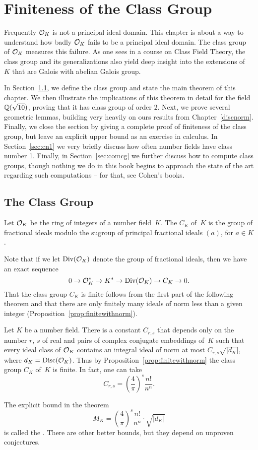 \chapter{Finiteness of the Class Group}\label{ch:classgroup}
Frequently $\mathcal{O}_K$ is not a principal ideal domain.  This chapter is
about a way to understand how badly $\mathcal{O}_K$ fails to be a principal
ideal domain.  The class group of $\mathcal{O}_K$ measures this failure.  As
one sees in a course on Class Field Theory, the class group and its
generalizations also yield deep insight into the 
extensions of~$K$ that are Galois with abelian Galois group.

In Section~\ref{sec:theclassgroup}, we define the class group and
state the main theorem of this chapter.  We then illustrate the
implications of this theorem in detail for the field $\mathbb{Q}(\sqrt{10})$,
proving that it has class group of order $2$. Next, we prove several
geometric lemmas, building very heavily on ours results from
Chapter~\ref{discnorm}.  Finally, we close the section by giving a
complete proof of finiteness of the class group, but leave an explicit
upper bound as an exercise in calculus.  In Section~\ref{sec:cn1} we
very briefly discuss how often number fields have class number 1.
Finally, in Section~\ref{sec:comcg} we further discuss how to compute
class groups, though nothing we do in this book begins to approach the
state of the art regarding such computations -- for that, see Cohen's
books.

\section{The Class Group}\label{sec:theclassgroup}
\begin{definition}
Let $\mathcal{O}_K$ be the ring of integers of a number field~$K$.  The 
 $C_K$ of~$K$ is the group of fractional ideals
modulo the sugroup of principal fractional ideals $(a)$, for $a\in K$.
\end{definition}

Note that if we let $\operatorname{Div}(\mathcal{O}_K)$ denote the group of  fractional
ideals, then we have an exact sequence
$$
  0 \to \mathcal{O}_K^* \to K^* \to \operatorname{Div}(\mathcal{O}_K) \to C_K \to 0.
$$
That the class group $C_K$ is finite follows from the first part of
the following theorem and that there are only finitely many
ideals of norm less than a given integer (Proposition~\ref{prop:finitewithnorm}).
\begin{theorem}\label{thm:finiteclassgrp}
Let $K$ be a number field.  There is a constant $C_{r,s}$ that
depends only on the number $r$, $s$ of real and pairs
of complex conjugate embeddings of~$K$ such that
every ideal class of $\mathcal{O}_K$ contains an integral ideal
of norm at most $C_{r,s}\sqrt{|d_K|}$, where
$d_K=\operatorname{Disc}(\mathcal{O}_K)$.
Thus by Proposition~\ref{prop:finitewithnorm} 
the class group $C_K$ of~$K$ is
finite.
In fact, one can take
$$C_{r,s} = \left(\frac{4}{\pi}\right)^s\frac{n!}{n^n}.$$
\end{theorem}
The explicit bound in the theorem 
$$M_K = \left(\frac{4}{\pi}\right)^s\frac{n!}{n^n} \cdot \sqrt{|d_K|}$$
is called the .  There are other better bounds, but they depend on unproven
conjectures.

